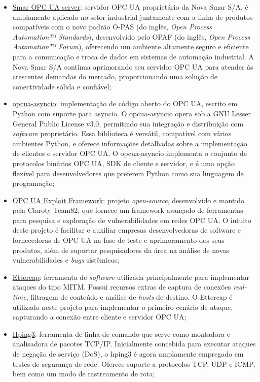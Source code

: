     \begin{itemize}
        \item \underline{Smar OPC UA server}: servidor OPC UA proprietário da Nova Smar S/A, é amplamente aplicado no setor industrial juntamente com a linha de produtos compatíveis com o novo padrão O-PAS (do inglês, \textit{Open Process Automation™ Standards}), desenvolvido pelo OPAF (do inglês, \textit{Open Process Automation™ Forum}), oferecendo um ambiente altamente seguro e eficiente para a comunicação e troca de dados em sistemas de automação industrial. A Nova Smar S/A continua aprimorando seu servidor OPC UA para atender às crescentes demandas do mercado, proporcionando uma solução de conectividade sólida e confiável;
        \item \underline{opcua-asyncio}: implementação de código aberto do OPC UA, escrito em Python com suporte para asyncio. O opcua-asyncio opera sob a GNU Lesser General Public License v3.0,  permitindo sua integração e distribuição com \textit{software} proprietário. Essa biblioteca é versátil, compatível com vários ambientes Python, e oferece informações detalhadas sobre a implementação de clientes e servidor OPC UA. O opcua-asyncio implementa o conjunto de protocolos binários OPC UA, SDK de cliente e servidor, e é uma opção flexível para desenvolvedores que preferem Python como sua linguagem de programação;
        \item \underline{OPC UA Exploit Framework}: projeto \textit{open-source}, desenvolvido e mantido pela Claroty Team82, que fornece um framework avançado de ferramentas para pesquisa e exploração de vulnerabilidades em redes OPC UA. O intuito deste projeto é facilitar e auxiliar empresas desenvolvedoras de software e fornecedoras de OPC UA na fase de teste e aprimoramento dos seus produtos, além de suportar pesquisadores da área na análise de novas vulnerabilidades e \textit{bugs} sistêmicos;
        \item \underline{Ettercap}: ferramenta de \textit{software} utilizada principalmente para implementar ataques do tipo MITM. Possui recursos extras de captura de conexões \textit{real-time}, filtragem de conteúdo e análise de \textit{hosts} de destino. O Ettercap é utilizado neste projeto para implementar o primeiro cenário de ataque, capturando a conexão entre cliente e servidor OPC UA;
        \item \underline{Hping3}: ferramenta de linha de comando que serve como montadora e analisadora de pacotes TCP/IP. Inicialmente concebida para executar ataques de negação de serviço (DoS), o hping3 é agora amplamente empregado em testes de segurança de rede. Oferece suporte a protocolos TCP, UDP e ICMP, bem como um modo de rastreamento de rota;

\end{itemize}
